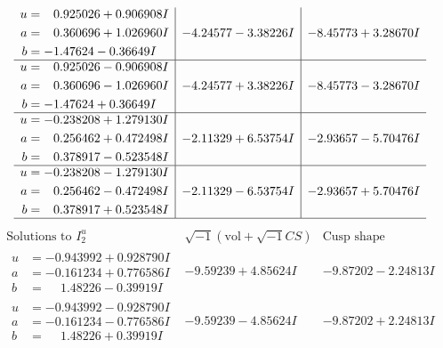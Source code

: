 \documentclass[1p]{elsarticle_modified}
\theoremstyle{definition}
\newcommand{\I}{\sqrt{-1}}
\begin{document}
$$\begin{array}{c|c|c}
\begin{aligned}
u &= \phantom{-}0.925026 + 0.906908 I \\
a &= \phantom{-}0.360696 + 1.026960 I \\
b &= -1.47624 - 0.36649 I\end{aligned}
 & -4.24577 - 3.38226 I & -8.45773 + 3.28670 I \\ \hline\begin{aligned}
u &= \phantom{-}0.925026 - 0.906908 I \\
a &= \phantom{-}0.360696 - 1.026960 I \\
b &= -1.47624 + 0.36649 I\end{aligned}
 & -4.24577 + 3.38226 I & -8.45773 - 3.28670 I \\ \hline\begin{aligned}
u &= -0.238208 + 1.279130 I \\
a &= \phantom{-}0.256462 + 0.472498 I \\
b &= \phantom{-}0.378917 - 0.523548 I\end{aligned}
 & -2.11329 + 6.53754 I & -2.93657 - 5.70476 I \\ \hline\begin{aligned}
u &= -0.238208 - 1.279130 I \\
a &= \phantom{-}0.256462 - 0.472498 I \\
b &= \phantom{-}0.378917 + 0.523548 I\end{aligned}
 & -2.11329 - 6.53754 I & -2.93657 + 5.70476 I\\
 \hline 
 \end{array}$$\newpage$$\begin{array}{c|c|c}  
\text{Solutions to }I^u_{2}& \I (\text{vol} + \sqrt{-1}CS) & \text{Cusp shape}\\
 \hline 
\begin{aligned}
u &= -0.943992 + 0.928790 I \\
a &= -0.161234 + 0.776586 I \\
b &= \phantom{-}1.48226 - 0.39919 I\end{aligned}
 & -9.59239 + 4.85624 I & -9.87202 - 2.24813 I \\ \hline\begin{aligned}
u &= -0.943992 - 0.928790 I \\
a &= -0.161234 - 0.776586 I \\
b &= \phantom{-}1.48226 + 0.39919 I\end{aligned}
 & -9.59239 - 4.85624 I & -9.87202 + 2.24813 I \\ \hline\begin{aligned}

\end{aligned}
\end{array}$$
\end{document}
